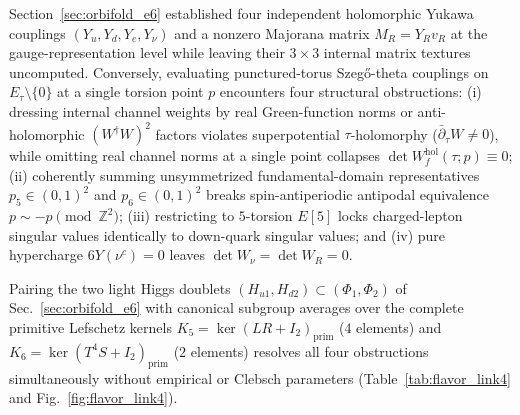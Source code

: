 \documentclass[aps,prd,twocolumn,nofootinbib,floatfix]{revtex4-2}
\begin{document}
Section~\ref{sec:orbifold_e6} established four independent holomorphic Yukawa couplings $(Y_u, Y_d, Y_e, Y_\nu)$ and a nonzero Majorana matrix $M_R = Y_R v_R$ at the gauge-representation level while leaving their $3\times 3$ internal matrix textures uncomputed.
Conversely, evaluating punctured-torus Szeg\H{o}-theta couplings on $E_\tau\setminus\{0\}$ at a single torsion point $p$ encounters four structural obstructions: (i) dressing internal channel weights by real Green-function norms or anti-holomorphic $(W^\dagger W)^2$ factors violates superpotential $\tau$-holomorphy ($\bar{\partial}_\tau W \ne 0$), while omitting real channel norms at a single point collapses $\det W_f^{\mathrm{hol}}(\tau; p) \equiv 0$; (ii) coherently summing unsymmetrized fundamental-domain representatives $p_5 \in (0,1)^2$ and $p_6 \in (0,1)^2$ breaks spin-antiperiodic antipodal equivalence $p \sim -p \pmod{\mathbb{Z}^2}$; (iii) restricting to $5$-torsion $E[5]$ locks charged-lepton singular values identically to down-quark singular values; and (iv) pure hypercharge $6Y(\nu^c) = 0$ leaves $\det W_\nu = \det W_R = 0$.

Pairing the two light Higgs doublets $(H_{u1}, H_{d2}) \subset (\Phi_1, \Phi_2)$ of Sec.~\ref{sec:orbifold_e6} with canonical subgroup averages over the complete primitive Lefschetz kernels $K_5 = \ker(LR + I_2)_{\mathrm{prim}}$ ($4$ elements) and $K_6 = \ker(T^4 S + I_2)_{\mathrm{prim}}$ ($2$ elements) resolves all four obstructions simultaneously without empirical or Clebsch parameters (Table~\ref{tab:flavor_link4} and Fig.~\ref{fig:flavor_link4}).
\end{document}
